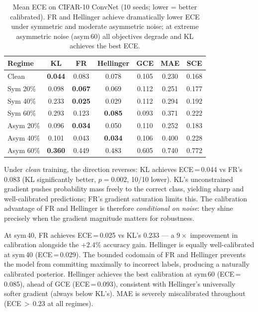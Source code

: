 \documentclass[11pt]{article}
\begin{document}
\begin{table}[h]
  \centering
  \caption{Mean ECE on CIFAR-10 ConvNet (10 seeds; lower = better calibrated).
    FR and Hellinger achieve dramatically lower ECE under symmetric and moderate
    asymmetric noise; at extreme asymmetric noise (asym\,60) all objectives degrade
    and KL achieves the best ECE.}
  \label{tab:ece_cifar10}
  \small
  \begin{tabular}{lcccccc}
    \toprule
    Regime & KL & FR & Hellinger & GCE & MAE & SCE \\
    \midrule
    Clean    & \textbf{0.044} & 0.083 & 0.078 & 0.105 & 0.230 & 0.168 \\
    Sym 20\% & 0.098 & \textbf{0.067} & 0.069 & 0.112 & 0.251 & 0.177 \\
    Sym 40\% & 0.233 & \textbf{0.025} & 0.029 & 0.112 & 0.294 & 0.192 \\
    Sym 60\% & 0.293 & 0.123 & \textbf{0.085} & 0.093 & 0.371 & 0.222 \\
    Asym 20\% & 0.096 & \textbf{0.034} & 0.050 & 0.110 & 0.252 & 0.183 \\
    Asym 40\% & 0.101 & 0.043 & \textbf{0.034} & 0.106 & 0.400 & 0.228 \\
    Asym 60\% & \textbf{0.360} & 0.449 & 0.483 & 0.605 & 0.740 & 0.772 \\
    \bottomrule
  \end{tabular}
\end{table}

Under \emph{clean} training, the direction reverses: KL achieves ECE\,=\,0.044
vs FR's 0.083 (KL significantly better, $p=0.002$, 10/10 lower).
KL's unconstrained gradient pushes probability mass freely to the correct class,
yielding sharp and well-calibrated predictions; FR's gradient saturation limits this.
The calibration advantage of FR and Hellinger is therefore \emph{conditional on
noise}: they shine precisely when the gradient magnitude matters for robustness.

At sym\,40, FR achieves ECE\,=\,0.025 vs KL's 0.233 — a $9\times$ improvement in
calibration alongside the $+2.4\%$ accuracy gain.
Hellinger is equally well-calibrated at sym\,40 (ECE\,=\,0.029).
The bounded codomain of FR and Hellinger prevents the model from committing
maximally to incorrect labels, producing a naturally calibrated posterior.
Hellinger achieves the best calibration at sym\,60 (ECE\,=\,0.085), ahead of
GCE (ECE\,=\,0.093), consistent with Hellinger's universally softer gradient (always below KL's).
MAE is severely miscalibrated throughout (ECE\,$>$\,0.23 at all regimes).
\end{document}
